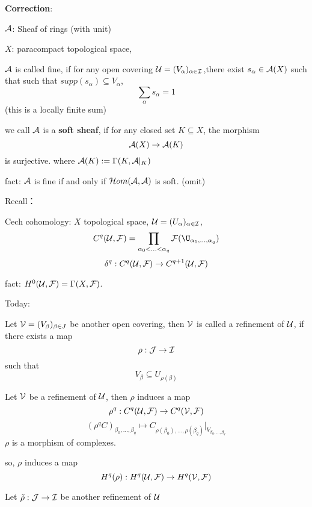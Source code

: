 
\textbf{Correction}:

$\mathcal{A}$: Sheaf of rings (with unit)

$X$: paracompact topological space,

\begin{definition}
$\mathcal{A}$ is called fine, if for any open covering
$\mathcal{U}=(V_{\alpha})_{\alpha\in\mathcal{I}}$,there exist
$s_{\alpha}\in\mathcal{A}(X)$
such that such that $supp(s_{\alpha})\subseteq V_{\alpha}$,
$$\sum_{\alpha}s_{\alpha}=1$$
(this is a locally finite sum)
\end{definition}

\begin{rem}
we call $\mathcal{A}$ is a \textbf{soft sheaf},
if for any closed set $K\subseteq X$,
the morphism
$$\mathcal{A}(X)\to \mathcal{A}(K)$$
is surjective.
where $\mathcal{A}(K):=\Gamma(K,\mathcal{A}|_K)$
\end{rem}

fact: $\mathcal{A}$ is fine if and only if
$\mathcal{H} om(\mathcal{A},\mathcal{A})$ is soft.
(omit)

Recall：

Cech cohomology: $X$ topological space,
$\mathcal{U}=(U_{\alpha})_{\alpha\in\mathcal{I}}$,
$$C^q(\mcalU,\mcalF)=
\prod_{\alpha_0<...<\alpha_q}\mcalF(\U_{\alpha_1,...,\alpha_q})$$
$$\delta^q:C^q(\mathcal{U},\mathcal{F})\to C^{q+1}(\mathcal{U},\mathcal{F})$$

fact: $H^0(\mathcal{U},\mathcal{F})=\Gamma(X,\mathcal{F})$.

Today:

\begin{definition}
Let $\mathcal{V}=(V_{\beta})_{\beta\in J}$ be another open covering,
then $\mathcal{V}$ is called a refinement of $\mathcal{U}$, if there exists a map
$$\rho:\mathcal{J}\to\mathcal{I}$$
such that
$$V_{\beta}\subseteq U_{\rho(\beta)}$$
\end{definition}

\begin{prop}
Let $\mathcal{V}$ be a refinement of $\mathcal{U}$, then $\rho$ induces a map
$$\rho^q:C^q(\mathcal{U},\mathcal{F})\to C^q(\mathcal{V},\mathcal{F})$$
$$(\rho^qC)_{\beta_0,...,\beta_q}\mapsto
C_{\rho(\beta_0),...,\rho(\beta_q)}|_{V_{\beta_0,...,\beta_q}}$$
$\rho$ is a morphism of complexes.
\end{prop}

so, $\rho$ induces a map
$$H^q(\rho):H^q(\mathcal{U},\mathcal{F})\to H^q(\mathcal{V},\mathcal{F})$$

Let $\tilde{\rho}:\mathcal{J}\to\mathcal{I}$ be another refinement of $\mathcal{U}$

